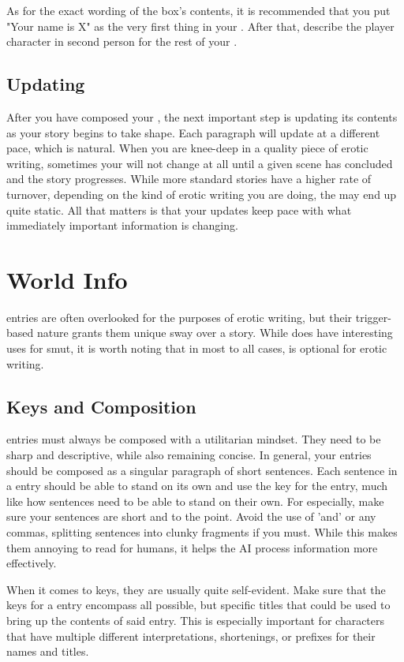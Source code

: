 ﻿\documentclass[Coomer-main.tex]{subfiles}
\begin{document}
As for the exact wording of the \rem box's contents, it is recommended that you put "Your name is X" as the very first thing in your \rem. After that, describe the player character in second person for the rest of your \rem.

\section{Updating}

After you have composed your \rem, the next important step is updating its contents as your story begins to take shape. Each paragraph will update at a different pace, which is natural. When you are knee-deep in a quality piece of erotic writing, sometimes your \rem will not change at all until a given scene has concluded and the story progresses. While more standard stories have a higher rate of \rem turnover, depending on the kind of erotic writing you are doing, the \rem may end up quite static. All that matters is that your updates keep pace with what immediately important information is changing.

\chapter{World Info}

\wi entries are often overlooked for the purposes of erotic writing, but their trigger-based nature grants them unique sway over a story. While \wi does have interesting uses for smut, it is worth noting that in most to all cases, \wi is optional for erotic writing.

\section{Keys and Composition}

\wi entries must always be composed with a utilitarian mindset. They need to be sharp and descriptive, while also remaining concise. In general, your entries should be composed as a singular paragraph of short sentences. Each sentence in a \wi entry should be able to stand on its own and use the key for the entry, much like how \rem sentences need to be able to stand on their own. For \wi especially, make sure your sentences are short and to the point. Avoid the use of 'and' or any commas, splitting sentences into clunky fragments if you must. While this makes them annoying to read for humans, it helps the AI process information more effectively.

When it comes to keys, they are usually quite self-evident. Make sure that the keys for a \wi entry encompass all possible, but specific titles that could be used to bring up the contents of said entry. This is especially important for characters that have multiple different interpretations, shortenings, or prefixes for their names and titles.
\end{document}
